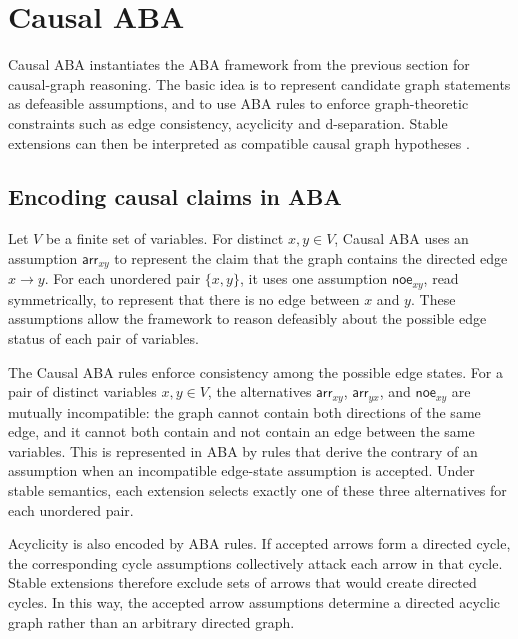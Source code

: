 \section{Causal ABA}

Causal ABA instantiates the ABA framework from the previous section for causal-graph reasoning. The basic idea is to represent candidate graph statements as defeasible assumptions, and to use ABA rules to enforce graph-theoretic constraints such as edge consistency, acyclicity and d-separation. Stable extensions can then be interpreted as compatible causal graph hypotheses \cite{russo2024argumentative}.

\subsection{Encoding causal claims in ABA}

Let \(V\) be a finite set of variables. For distinct \(x,y \in V\), Causal ABA uses an assumption \(\mathsf{arr}_{xy}\) to represent the claim that the graph contains the directed edge \(x \to y\). For each unordered pair \(\{x,y\}\), it uses one assumption \(\mathsf{noe}_{xy}\), read symmetrically, to represent that there is no edge between \(x\) and \(y\). These assumptions allow the framework to reason defeasibly about the possible edge status of each pair of variables.

The Causal ABA rules enforce consistency among the possible edge states. For a pair of distinct variables \(x,y \in V\), the alternatives \(\mathsf{arr}_{xy}\), \(\mathsf{arr}_{yx}\), and \(\mathsf{noe}_{xy}\) are mutually incompatible: the graph cannot contain both directions of the same edge, and it cannot both contain and not contain an edge between the same variables. This is represented in ABA by rules that derive the contrary of an assumption when an incompatible edge-state assumption is accepted. Under stable semantics, each extension selects exactly one of these three alternatives for each unordered pair.

Acyclicity is also encoded by ABA rules. If accepted arrows form a directed cycle, the corresponding cycle assumptions collectively attack each arrow in that cycle. Stable extensions therefore exclude sets of arrows that would create directed cycles. In this way, the accepted arrow assumptions determine a directed acyclic graph rather than an arbitrary directed graph.

